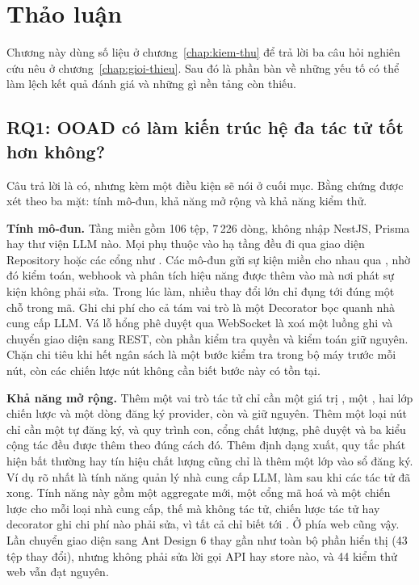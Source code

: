 \chapter{Thảo luận}
\label{chap:thao-luan}

Chương này dùng số liệu ở chương~\ref{chap:kiem-thu} để trả lời ba câu hỏi nghiên cứu nêu ở chương~\ref{chap:gioi-thieu}. Sau đó là phần bàn về những yếu tố có thể làm lệch kết quả đánh giá và những gì nền tảng còn thiếu.

\section{RQ1: OOAD có làm kiến trúc hệ đa tác tử tốt hơn không?}

Câu trả lời là có, nhưng kèm một điều kiện sẽ nói ở cuối mục. Bằng chứng được xét theo ba mặt: tính mô-đun, khả năng mở rộng và khả năng kiểm thử.

\textbf{Tính mô-đun.} Tầng miền gồm 106 tệp, 7\,226 dòng, không nhập NestJS, Prisma hay thư viện LLM nào. Mọi phụ thuộc vào hạ tầng đều đi qua giao diện Repository hoặc các cổng như . Các mô-đun gửi sự kiện miền cho nhau qua , nhờ đó kiểm toán, webhook và phân tích hiệu năng được thêm vào mà nơi phát sự kiện không phải sửa. Trong lúc làm, nhiều thay đổi lớn chỉ đụng tới đúng một chỗ trong mã. Ghi chi phí cho cả tám vai trò là một Decorator bọc quanh nhà cung cấp LLM. Vá lỗ hổng phê duyệt qua WebSocket là xoá một luồng ghi và chuyển giao diện sang REST, còn phần kiểm tra quyền và kiểm toán giữ nguyên. Chặn chi tiêu khi hết ngân sách là một bước kiểm tra trong bộ máy trước mỗi nút, còn các chiến lược nút không cần biết bước này có tồn tại.

\textbf{Khả năng mở rộng.} Thêm một vai trò tác tử chỉ cần một giá trị , một , hai lớp chiến lược và một dòng đăng ký provider, còn  và  giữ nguyên. Thêm một loại nút chỉ cần một  tự đăng ký, và quy trình con, cổng chất lượng, phê duyệt và ba kiểu cộng tác đều được thêm theo đúng cách đó. Thêm định dạng xuất, quy tắc phát hiện bất thường hay tín hiệu chất lượng cũng chỉ là thêm một lớp vào sổ đăng ký. Ví dụ rõ nhất là tính năng quản lý nhà cung cấp LLM, làm sau khi các tác tử đã xong. Tính năng này gồm một aggregate mới, một cổng mã hoá và một chiến lược cho mỗi loại nhà cung cấp, thế mà không tác tử, chiến lược tác tử hay decorator ghi chi phí nào phải sửa, vì tất cả chỉ biết tới . Ở phía web cũng vậy. Lần chuyển giao diện sang Ant Design 6 thay gần như toàn bộ phần hiển thị (43 tệp thay đổi), nhưng không phải sửa lời gọi API hay store nào, và 44 kiểm thử web vẫn đạt nguyên.

